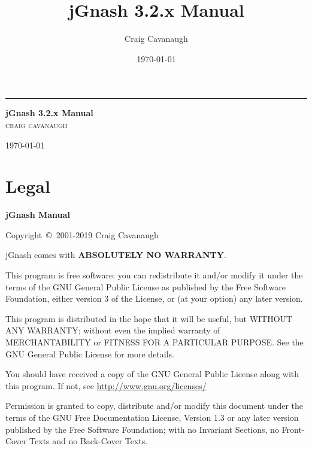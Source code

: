 \documentclass[letterpaper,12pt]{book}
\title{\textbf{jGnash 3.2.x Manual} }
\author{Craig Cavanaugh}
\date{\today}
\begin{document}
    \begin{titlepage}

        \raggedleft %

        {\color{gray} \rule{4pt}{\textheight}} %
        \hspace{0.08\textwidth} %
        \parbox[b]{0.75\textwidth}{ %

        {\Huge\bfseries jGnash 3.2.x Manual}\\[2\baselineskip] %
        {\Large\textsc{craig cavanaugh}}

        \vspace{0.5\textheight} %

        {\noindent \today}\\[\baselineskip] %
        }

    \end{titlepage}

    \tableofcontents
    
    \chapter{Legal}\label{ch:legal}
    {\bfseries jGnash Manual}

    Copyright~\copyright~2001-2019 Craig Cavanaugh

    jGnash comes with \textbf{ABSOLUTELY NO WARRANTY}.

    This program is free software: you can redistribute it and/or modify it under the terms of the GNU General Public
    License as published by the Free Software Foundation, either version 3 of the License, or (at your option) any later version.

    This program is distributed in the hope that it will be useful, but WITHOUT ANY WARRANTY; without even the implied
    warranty of MERCHANTABILITY or FITNESS FOR A PARTICULAR PURPOSE. See the GNU General Public License for more details.

    You should have received a copy of the GNU General Public License along with this program.
    If not, see \href{http://www.gnu.org/licenses/}{http://www.gnu.org/licenses/}

    Permission is granted to copy, distribute and/or modify this document under the terms of the GNU Free Documentation
    License, Version 1.3 or any later version published by the Free Software Foundation; with no Invariant Sections,
    no Front-Cover Texts and no Back-Cover Texts.
\end{document}
